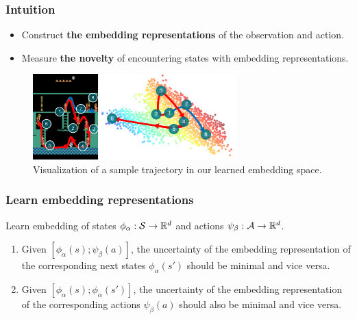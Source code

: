\documentclass[10pt,mathserif]{beamer}
\begin{document}



\begin{frame}
\frametitle{Intuition}
  \begin{itemize} \itemsep=6pt
      \item Construct \textbf{the embedding representations} of the observation and action.
      \item Measure \textbf{the novelty} of encountering states with embedding representations.
  \end{itemize}
  \pause

  \begin{figure}[h]
        \centering
          \includegraphics[width=0.7\textwidth]{emi_figures/figure_embedding_concept}
          \caption{Visualization of a sample trajectory in our learned embedding space.}
  \end{figure}

\end{frame}



\begin{frame}
\frametitle{Learn embedding representations}

Learn embedding of states $\phi_\alpha : \mathcal{S} \rightarrow \mathbb R^d$ and actions $\psi_\beta: \mathcal{A} \rightarrow \mathbb R^d$.
\vspace{1em}

\begin{enumerate} \itemsep=12pt
\item Given $[\phi_\alpha(s); \psi_\beta(a)]$, the uncertainty of the embedding representation of the corresponding next states $\phi_\alpha(s')$ should be minimal and vice versa. \pause

\item Given $[\phi_\alpha(s); \phi_\alpha(s')]$, the uncertainty of the embedding representation of the corresponding actions $\psi_\beta(a)$ should also be minimal and vice versa.

\end{enumerate}
\end{frame}
\end{document}

